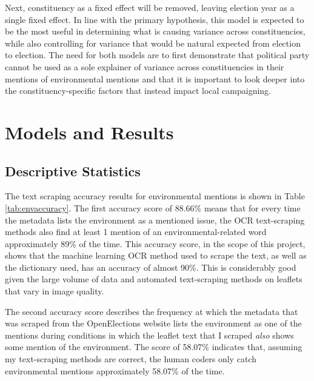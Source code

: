 \documentclass[12pt,letterpaper]{article}
\begin{document}
Next, constituency as a fixed effect will be removed, leaving election year as a single fixed effect. In line with the primary hypothesis, this model is expected to be the most useful in determining what is causing variance across constituencies, while also controlling for variance that would be natural expected from election to election. The need for both models are to first demonstrate that political party cannot be used as a sole explainer of variance across constituencies in their mentions of environmental mentions and that it is important to look deeper into the constituency-specific factors that instead impact local campaigning.
	
\newpage

\section{Models and Results}


\subsection{Descriptive Statistics}


The text scraping accuracy results for environmental mentions is shown in Table~ \ref{tab:envaccuracy}. The first accuracy score of 88.66\% means that for every time the metadata lists the environment as a mentioned issue, the OCR text-scraping methods also find at least 1 mention of an environmental-related word approximately 89\% of the time. This accuracy score, in the scope of this project, shows that the machine learning OCR method used to scrape the text, as well as the dictionary used, has an accuracy of almost 90\%. This is considerably good given the large volume of data and automated text-scraping methods on leaflets that vary in image quality.

The second accuracy score describes the frequency at which the metadata that was scraped from the OpenElections website lists the environment as one of the mentions during conditions in which the leaflet text that I scraped \textit{also} shows some mention of the environment. The score of 58.07\% indicates that, assuming my text-scraping methods are correct, the human coders only catch environmental mentions approximately 58.07\% of the time. 




\vspace{0.5cm}
\end{document}
